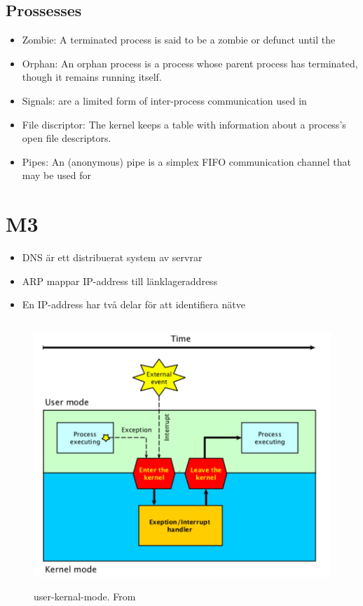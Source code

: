 \begin{multicols}{2}
\subsection{Prossesses}
\begin{itemize}
\item Zombie: A terminated process is said to be a zombie or defunct until the
\item Orphan: An orphan process is a process whose parent process has terminated, though it remains running itself.
\item Signals: are a limited form of inter-process communication used in
\item File discriptor: The kernel keeps a table with information about a process’s open file descriptors.
\item Pipes: An (anonymous) pipe is a simplex FIFO communication channel that may be used for
\end{itemize}

\section{M3}
\begin{itemize}
\item DNS är ett distribuerat system av servrar
\item ARP mappar IP-address till länklageraddress
\item En IP-address har två delar för att identifiera nätve
\end{itemize}

\begin{figure}[h]
    \vspace{10mm}
    \centering
    \includegraphics[width=14cm, height=10cm]{image/user-kernal-mode.png}
    \caption{user-kernal-mode. From \cite{}}
\end{figure}


\end{multicols}

